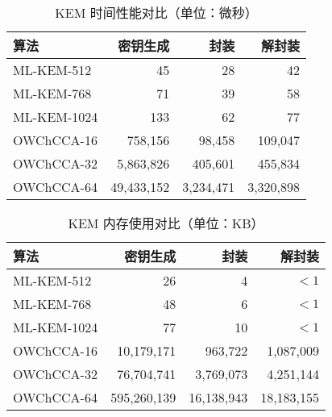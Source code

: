 \begin{table}[ht]
\centering
\caption{KEM 时间性能对比（单位：微秒）}
\begin{tabular}{|l|r|r|r|}
\hline
\textbf{算法} & \textbf{密钥生成} & \textbf{封装} & \textbf{解封装} \\
\hline
ML-KEM-512    & 45                & 28            & 42              \\
ML-KEM-768    & 71                & 39            & 58              \\
ML-KEM-1024   & 133               & 62            & 77              \\
\hline
OWChCCA-16    & 758,156           & 98,458        & 109,047         \\
OWChCCA-32    & 5,863,826         & 405,601       & 455,834         \\
OWChCCA-64    & 49,433,152        & 3,234,471     & 3,320,898       \\
\hline
\end{tabular}
\label{tab:kem-time-perf}
\end{table}

\begin{table}[ht]
\centering
\caption{KEM 内存使用对比（单位：KB）}
\begin{tabular}{|l|r|r|r|}
\hline
\textbf{算法} & \textbf{密钥生成} & \textbf{封装} & \textbf{解封装} \\
\hline
ML-KEM-512    & 26                & 4             & $<1$            \\
ML-KEM-768    & 48                & 6             & $<1$            \\
ML-KEM-1024   & 77                & 10            & $<1$            \\
\hline
OWChCCA-16    & 10,179,171        & 963,722       & 1,087,009       \\
OWChCCA-32    & 76,704,741        & 3,769,073     & 4,251,144       \\
OWChCCA-64    & 595,260,139       & 16,138,943    & 18,183,155      \\
\hline
\end{tabular}
\label{tab:kem-mem-usage}
\end{table}

